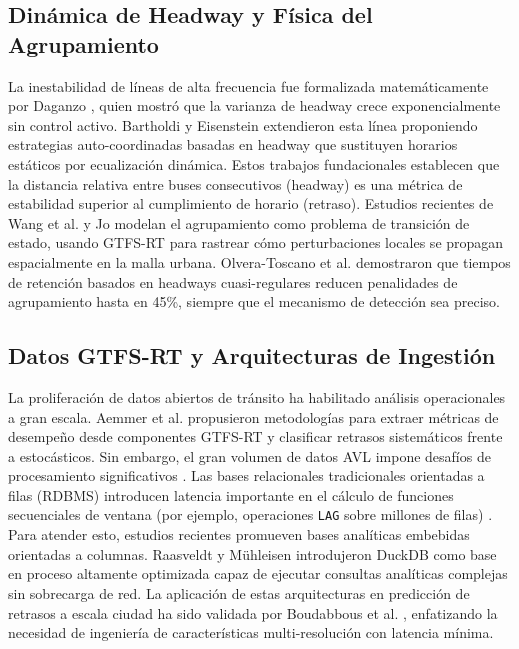 \documentclass[journal,twocolumn]{IEEEtran}
\begin{document}
\subsection{Dinámica de Headway y Física del Agrupamiento}
La inestabilidad de líneas de alta frecuencia fue formalizada matemáticamente por Daganzo \cite{1}, quien mostró que la varianza de headway crece exponencialmente sin control activo. Bartholdi y Eisenstein \cite{2} extendieron esta línea proponiendo estrategias auto-coordinadas basadas en headway que sustituyen horarios estáticos por ecualización dinámica. Estos trabajos fundacionales establecen que la distancia relativa entre buses consecutivos (headway) es una métrica de estabilidad superior al cumplimiento de horario (retraso). Estudios recientes de Wang et al. \cite{3} y Jo \cite{4} modelan el agrupamiento como problema de transición de estado, usando GTFS-RT para rastrear cómo perturbaciones locales se propagan espacialmente en la malla urbana. Olvera-Toscano et al. \cite{10} demostraron que tiempos de retención basados en headways cuasi-regulares reducen penalidades de agrupamiento hasta en 45\%, siempre que el mecanismo de detección sea preciso.

\subsection{Datos GTFS-RT y Arquitecturas de Ingestión}
La proliferación de datos abiertos de tránsito ha habilitado análisis operacionales a gran escala. Aemmer et al. \cite{11} propusieron metodologías para extraer métricas de desempeño desde componentes GTFS-RT y clasificar retrasos sistemáticos frente a estocásticos. Sin embargo, el gran volumen de datos AVL impone desafíos de procesamiento significativos \cite{12}. Las bases relacionales tradicionales orientadas a filas (RDBMS) introducen latencia importante en el cálculo de funciones secuenciales de ventana (por ejemplo, operaciones \texttt{LAG} sobre millones de filas) \cite{13}. Para atender esto, estudios recientes promueven bases analíticas embebidas orientadas a columnas. Raasveldt y Mühleisen \cite{14} introdujeron DuckDB como base en proceso altamente optimizada capaz de ejecutar consultas analíticas complejas sin sobrecarga de red. La aplicación de estas arquitecturas en predicción de retrasos a escala ciudad ha sido validada por Boudabbous et al. \cite{15}, enfatizando la necesidad de ingeniería de características multi-resolución con latencia mínima.
\end{document}
